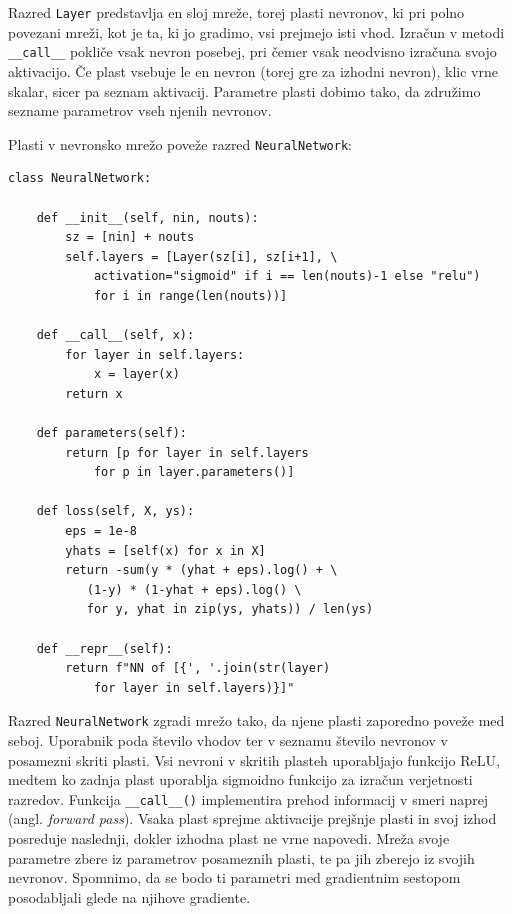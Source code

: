 Razred \texttt{Layer} predstavlja en sloj mreže, torej plasti nevronov, ki pri polno povezani mreži, kot je ta, ki jo gradimo, vsi prejmejo isti vhod. Izračun v metodi \texttt{\_\_call\_\_} pokliče vsak nevron posebej, pri čemer vsak neodvisno izračuna svojo aktivacijo. Če plast vsebuje le en nevron (torej gre za izhodni nevron), klic vrne skalar, sicer pa seznam aktivacij. Parametre plasti dobimo tako, da združimo sezname parametrov vseh njenih nevronov.

Plasti v nevronsko mrežo poveže razred \texttt{NeuralNetwork}:

\vspace*{3mm}
\begin{lstlisting}
class NeuralNetwork:

    def __init__(self, nin, nouts):
        sz = [nin] + nouts
        self.layers = [Layer(sz[i], sz[i+1], \
            activation="sigmoid" if i == len(nouts)-1 else "relu") 
            for i in range(len(nouts))]

    def __call__(self, x):
        for layer in self.layers:
            x = layer(x)
        return x

    def parameters(self):
        return [p for layer in self.layers 
            for p in layer.parameters()]

    def loss(self, X, ys):
        eps = 1e-8
        yhats = [self(x) for x in X]
        return -sum(y * (yhat + eps).log() + \
           (1-y) * (1-yhat + eps).log() \
           for y, yhat in zip(ys, yhats)) / len(ys)

    def __repr__(self):
        return f"NN of [{', '.join(str(layer) 
            for layer in self.layers)}]"
\end{lstlisting}

Razred \texttt{NeuralNetwork} zgradi mrežo tako, da njene plasti zaporedno poveže med seboj. Uporabnik poda število vhodov ter v seznamu število nevronov v posamezni skriti plasti. Vsi nevroni v skritih plasteh uporabljajo funkcijo ReLU, medtem ko zadnja plast uporablja sigmoidno funkcijo za izračun verjetnosti razredov.
%
%
Funkcija \texttt{\_\_call\_\_()} implementira prehod informacij v smeri naprej (angl. {\em forward pass}). Vsaka plast sprejme aktivacije prejšnje plasti in svoj izhod posreduje naslednji, dokler izhodna plast ne vrne napovedi. Mreža svoje parametre zbere iz parametrov posameznih plasti, te pa jih zberejo iz svojih nevronov. Spomnimo, da se bodo ti parametri med gradientnim sestopom posodabljali glede na njihove gradiente.

